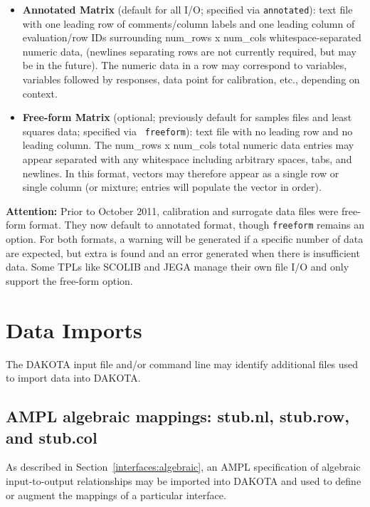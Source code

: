 \begin{itemize}
  \item {\bf Annotated Matrix} (default for all I/O; specified via
    {\tt annotated}): text file with one leading row of comments/column
    labels and one leading column of evaluation/row IDs surrounding
    num\_rows x num\_cols whitespace-separated numeric data, (newlines
    separating rows are not currently required, but may be in the
    future).  The numeric data in a row may correspond to variables,
    variables followed by responses, data point for calibration, etc.,
    depending on context.

   \item {\bf Free-form Matrix} (optional; previously default for
     samples files and least squares data; specified via {\tt
       freeform}): text file with no leading row and no leading
     column.  The num\_rows x num\_cols total numeric data entries may
     appear separated with any whitespace including arbitrary spaces,
     tabs, and newlines.  In this format, vectors may therefore appear
     as a single row or single column (or mixture; entries will
     populate the vector in order).
\end{itemize}

{\bf Attention:} Prior to October 2011, calibration and surrogate data
files were free-form format.  They now default to annotated format,
though {\tt freeform} remains an option.  For both formats, a warning
will be generated if a specific number of data are expected, but extra
is found and an error generated when there is insufficient data.  Some
TPLs like SCOLIB and JEGA manage their own file I/O and only support
the free-form option.

\section{Data Imports}\label{input:import}

The DAKOTA input file and/or command line may identify additional
files used to import data into DAKOTA.

\subsection{AMPL algebraic mappings: stub.nl, stub.row, and stub.col}

As described in Section~\ref{interfaces:algebraic}, an AMPL
specification of algebraic input-to-output relationships may be
imported into DAKOTA and used to define or augment the mappings of a
particular interface.


